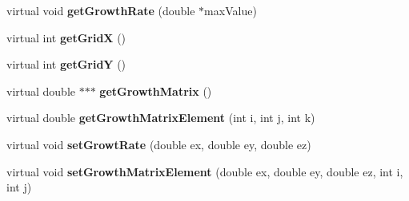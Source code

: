 \begin{DoxyCompactItemize}
\item 
\hypertarget{classGrowthFunctionBase_a9598654cae114f6b443167898ac4d095}{}virtual void {\bfseries get\+Growth\+Rate} (double $\ast$max\+Value)\label{classGrowthFunctionBase_a9598654cae114f6b443167898ac4d095}

\item 
\hypertarget{classGrowthFunctionBase_a1dfd024db9bf627777741c68f7b5ddf2}{}virtual int {\bfseries get\+Grid\+X} ()\label{classGrowthFunctionBase_a1dfd024db9bf627777741c68f7b5ddf2}

\item 
\hypertarget{classGrowthFunctionBase_a1445bfc812abb72fd6757859aa302feb}{}virtual int {\bfseries get\+Grid\+Y} ()\label{classGrowthFunctionBase_a1445bfc812abb72fd6757859aa302feb}

\item 
\hypertarget{classGrowthFunctionBase_a067bdcd836e7196ce5cfc9120b9499c1}{}virtual double $\ast$$\ast$$\ast$ {\bfseries get\+Growth\+Matrix} ()\label{classGrowthFunctionBase_a067bdcd836e7196ce5cfc9120b9499c1}

\item 
\hypertarget{classGrowthFunctionBase_a4e40d019aff99e72b1aee79d93c8e9a0}{}virtual double {\bfseries get\+Growth\+Matrix\+Element} (int i, int j, int k)\label{classGrowthFunctionBase_a4e40d019aff99e72b1aee79d93c8e9a0}

\item 
\hypertarget{classGrowthFunctionBase_abcfbd2e1fbad91b3f9002ef7fc7625e5}{}virtual void {\bfseries set\+Growt\+Rate} (double ex, double ey, double ez)\label{classGrowthFunctionBase_abcfbd2e1fbad91b3f9002ef7fc7625e5}

\item 
\hypertarget{classGrowthFunctionBase_a29781080624a8ab028af36f3326b6240}{}virtual void {\bfseries set\+Growth\+Matrix\+Element} (double ex, double ey, double ez, int i, int j)\label{classGrowthFunctionBase_a29781080624a8ab028af36f3326b6240}

\end{DoxyCompactItemize}
